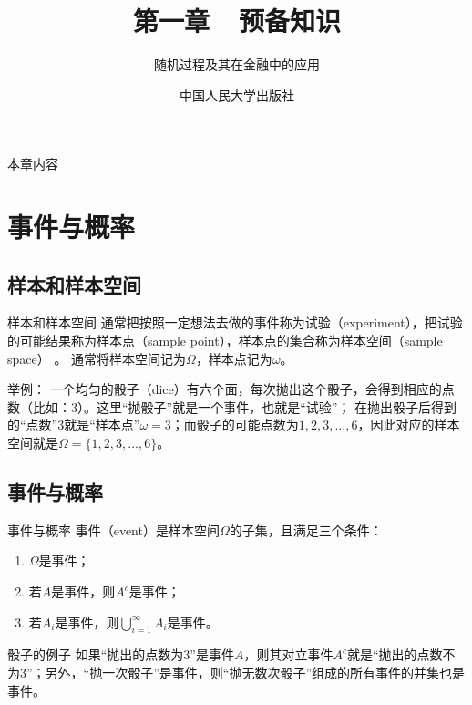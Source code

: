 \documentclass[t]{beamer}
\begin{document}
\fontsize{11}{18}\selectfont


\CTEXindent



  \title{第一章~~预备知识}
\author{随机过程及其在金融中的应用}
\date{中国人民大学出版社}
  \begin{frame}
    \maketitle
  \end{frame}

\begin{frame}{本章内容}
  \begin{multicols}{2}
    \tableofcontents
  \end{multicols}
\end{frame}

\section{事件与概率}
\subsection{样本和样本空间}
\begin{frame}{样本和样本空间}
  通常把按照一定想法去做的事件称为试验（experiment），把试验的可能结果称为样本点（sample
point），样本点的集合称为样本空间（sample space）
。
通常将样本空间记为$\Omega$，样本点记为$\omega$。

\begin{block}{举例：}
  一个均匀的骰子（dice）有六个面，每次抛出这个骰子，会得到相应的点数（比如：3）。这里“抛骰子”就是一个事件，也就是“试验”；
  在抛出骰子后得到的“点数”3就是“样本点”$\omega=3$；而骰子的可能点数为$1,2,3,\ldots,6$，因此对应的样本空间就是$\Omega=\{1,2,3,\ldots,6\}$。
\end{block}
  
  \end{frame}

  \subsection{事件与概率}
  \begin{frame}{事件与概率}
    事件（event）是样本空间$\Omega$的子集，且满足三个条件：
    \begin{enumerate}
      \item $\Omega$是事件；
      \item 若$A$是事件，则$A^c$是事件；
      \item 若$A_i$是事件，则$\bigcup\limits^{\infty}_{i=1}A_i$是事件。
    \end{enumerate}
  
\begin{block}{骰子的例子}
  如果“抛出的点数为3”是事件$A$，则其对立事件$A^c$就是“抛出的点数不为3”；另外，“抛一次骰子”是事件，则“抛无数次骰子”组成的所有事件的并集也是事件。
\end{block}

  \end{frame}
\end{document}
